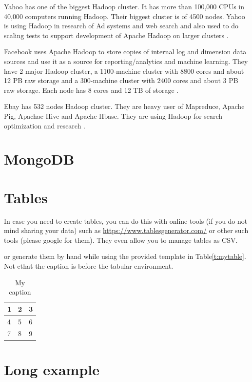 \documentclass[sigconf]{acmart}
\begin{document}
Yahoo has one of the biggest Hadoop cluster. It has more than 100,000 CPUs in 40,000 computers running Hadoop. Their biggest cluster is of 4500 nodes. Yahoo is using Hadoop in research of Ad systems and web search and also used to do scaling tests to support development of Apache Hadoop on larger clusters \cite{www-apache-poweredby}.

Facebook uses Apache Hadoop  to store copies of internal log and dimension data sources and use it as a source for reporting/analytics and machine learning. They have 2 major Hadoop cluster, a 1100-machine cluster with 8800 cores and about 12 PB raw storage and a 300-machine cluster with 2400 cores and about 3 PB raw storage. Each node has 8 cores and 12 TB of storage \cite{www-apache-poweredby}. 

Ebay has 532 nodes Hadoop cluster. They are heavy user of Mapreduce, Apache Pig, Apachae Hive and Apache Hbase. They are using Hadoop for search optimization and research \cite{www-apache-poweredby}. 

\section{MongoDB}


\section{Tables}

In case you need to create tables, you can do this with online tools
(if you do not mind sharing your data) such as
\url{https://www.tablesgenerator.com/} or other such tools (please
google for them). They even allow you to manage tables as CSV.

or generate them by hand while using the provided template in Table\ref{t:mytable}. Not ethat
the caption is before the tabular environment.

\begin{table}[htb]
\centering
\caption{My caption}
\label{t:mytabble}
\begin{tabular}{lll}
1 & 2 & 3 \\
\hline
4 & 5 & 6 \\
7 & 8 & 9
\end{tabular}
\end{table}

\section{Long example}
\end{document}
